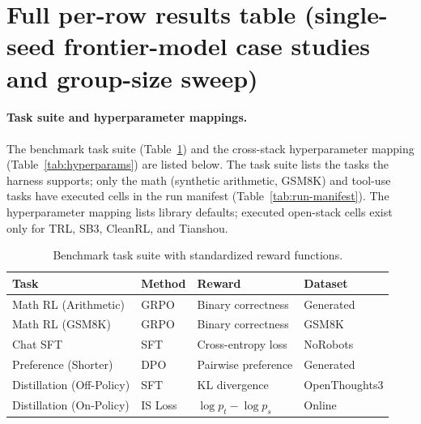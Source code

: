\section{Full per-row results table (single-seed frontier-model case studies and group-size sweep)}
\label{sec:appendix:full-results}

\paragraph{Task suite and hyperparameter mappings.}
The benchmark task suite (Table~\ref{tab:tasks}) and the cross-stack
hyperparameter mapping (Table~\ref{tab:hyperparams}) are listed below. The
task suite lists the tasks the harness supports; only the math (synthetic
arithmetic, GSM8K) and tool-use tasks have executed cells in the run
manifest (Table~\ref{tab:run-manifest}). The hyperparameter mapping lists
library defaults; executed open-stack cells exist only for TRL, SB3, CleanRL,
and Tianshou.

\begin{table}[ht]
\centering
\caption{Benchmark task suite with standardized reward functions.}
\label{tab:tasks}
\begin{tabular}{llll}
\toprule
\textbf{Task} & \textbf{Method} & \textbf{Reward} & \textbf{Dataset} \\
\midrule
Math RL (Arithmetic) & GRPO & Binary correctness & Generated \\
Math RL (GSM8K) & GRPO & Binary correctness & GSM8K \\
Chat SFT & SFT & Cross-entropy loss & NoRobots \\
Preference (Shorter) & DPO & Pairwise preference & Generated \\
Distillation (Off-Policy) & SFT & KL divergence & OpenThoughts3 \\
Distillation (On-Policy) & IS Loss & $\log p_t - \log p_s$ & Online \\
\bottomrule
\end{tabular}
\end{table}

